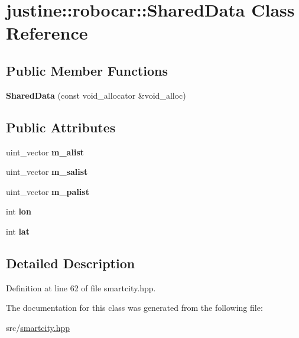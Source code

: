\hypertarget{classjustine_1_1robocar_1_1SharedData}{\section{justine\-:\-:robocar\-:\-:Shared\-Data Class Reference}
\label{classjustine_1_1robocar_1_1SharedData}
}
\subsection*{Public Member Functions}
\begin{DoxyCompactItemize}
\item 
\hypertarget{classjustine_1_1robocar_1_1SharedData_a87c2651f40582aedd62f9d9c3b6c8459}{{\bfseries Shared\-Data} (const void\-\_\-allocator \&void\-\_\-alloc)}\label{classjustine_1_1robocar_1_1SharedData_a87c2651f40582aedd62f9d9c3b6c8459}

\end{DoxyCompactItemize}
\subsection*{Public Attributes}
\begin{DoxyCompactItemize}
\item 
\hypertarget{classjustine_1_1robocar_1_1SharedData_a3630c63f80d3b75d91fe59829e001e57}{uint\-\_\-vector {\bfseries m\-\_\-alist}}\label{classjustine_1_1robocar_1_1SharedData_a3630c63f80d3b75d91fe59829e001e57}

\item 
\hypertarget{classjustine_1_1robocar_1_1SharedData_a778d32b1551d9fbd6c8c1a6aa3a8cf1d}{uint\-\_\-vector {\bfseries m\-\_\-salist}}\label{classjustine_1_1robocar_1_1SharedData_a778d32b1551d9fbd6c8c1a6aa3a8cf1d}

\item 
\hypertarget{classjustine_1_1robocar_1_1SharedData_a1a38db5cffcb433f5635f1953b8774f3}{uint\-\_\-vector {\bfseries m\-\_\-palist}}\label{classjustine_1_1robocar_1_1SharedData_a1a38db5cffcb433f5635f1953b8774f3}

\item 
\hypertarget{classjustine_1_1robocar_1_1SharedData_a25ee774ed2ae16e69d16daafedb94fa4}{int {\bfseries lon}}\label{classjustine_1_1robocar_1_1SharedData_a25ee774ed2ae16e69d16daafedb94fa4}

\item 
\hypertarget{classjustine_1_1robocar_1_1SharedData_a211fcd1fefd4788728a0f322ab53609e}{int {\bfseries lat}}\label{classjustine_1_1robocar_1_1SharedData_a211fcd1fefd4788728a0f322ab53609e}

\end{DoxyCompactItemize}


\subsection{Detailed Description}


Definition at line 62 of file smartcity.\-hpp.



The documentation for this class was generated from the following file\-:\begin{DoxyCompactItemize}
\item 
src/\hyperlink{smartcity_8hpp}{smartcity.\-hpp}\end{DoxyCompactItemize}
